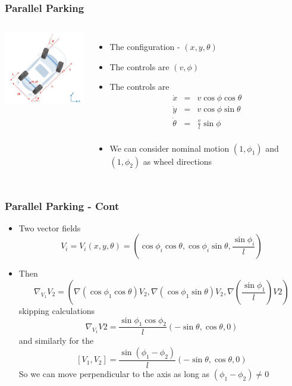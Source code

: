 \documentclass[10pt]{beamer}
\begin{document}
\begin{frame}
  \frametitle{Parallel Parking}
  \begin{columns}
    \column{5cm}
    \vfill
    \centerline{\includegraphics[width=4.9cm]{parallel-parking}}
    \vfill
    \column{6cm}
    \begin{itemize}
    \item The configuration - $(x, y, \theta)$
    \item The controls are $(v, \phi)$
    \item The controls are
      \[
        \begin{array}{rcl}
          \dot{x}& = & v \cos \phi \cos \theta\\
          \dot{y}& = & v \cos \phi \sin \theta\\
          \dot{\theta} & = & \frac{v}{l} \sin \phi\\
        \end{array}
      \]
    \item We can consider nominal motion $(1, \phi_1)$ and $(1, \phi_2)$ as wheel directions
    \end{itemize}
  \end{columns}
\end{frame}
\begin{frame}
  \frametitle{Parallel Parking - Cont}
  \begin{itemize}
    \item Two vector fields
      \[ V_i = V_i(x,y,\theta) =
        (\cos \phi_i \cos\theta, \cos\phi_i \sin\theta, \frac{\sin \phi_i}{l})
      \]
    \item Then
      \[
        \nabla_{V_1} V_2 = (\nabla(\cos\phi_1 \cos \theta) V_2,
        \nabla(\cos \phi_1 \sin \theta) V_2, \nabla(\frac{\sin \phi_1}{l}) V2)
      \] skipping calculations
      \[
        \nabla_{V_1} V2 = \frac{\sin \phi_1 \cos \phi_2}{l}(-\sin \theta, \cos \theta, 0)
      \]  and similarly for the 
      \[
        [V_1, V_2] = \frac{\sin(\phi_1 - \phi_2)}{l} (-\sin \theta, \cos \theta, 0)
      \] So we can move perpendicular to the axis as long as $(\phi_1-\phi_2)\neq 0 $
  \end{itemize}
\end{frame}
\end{document}
